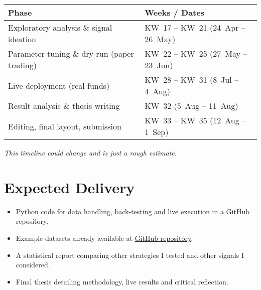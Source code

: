 \documentclass[12pt,a4paper]{article}
\begin{document}
\begin{tabular}{|>{\raggedright\arraybackslash}p{7cm}|>{\raggedright\arraybackslash}p{7cm}|}
\hline
\textbf{Phase} & \textbf{Weeks / Dates}\\ \hline
Exploratory analysis \& signal ideation & KW~17 -- KW~21 (24~Apr -- 26~May)\\ \hline
Parameter tuning \& dry-run (paper trading) & KW~22 -- KW~25 (27~May -- 23~Jun)\\ \hline
Live deployment (real funds) & KW~28 -- KW~31 (8~Jul -- 4~Aug)\\ \hline
Result analysis \& thesis writing & KW~32 (5~Aug -- 11~Aug)\\ \hline
Editing, final layout, submission & KW~33 -- KW~35 (12~Aug -- 1~Sep)\\ \hline
\end{tabular}

\vspace{0.5em}

\begin{tcolorbox}[colback=blue!10!white, colframe=blue!10!white, boxrule=0pt, arc=0pt, left=0pt, right=0pt, top=0pt, bottom=0pt]
\textit{This timeline could change and is just a rough estimate.}
\end{tcolorbox}

\section{Expected Delivery}
\begin{itemize}
  \item Python code for data handling, back-testing and live execution in a GitHub repository.
  \item Example datasets already available at
        \href{https://github.com/AJslashTracey/OBDeltaData}{GitHub repository}.
  \item A statistical report comparing other strategies I tested and other signals I considered.
  \item Final thesis detailing methodology, live results and critical reflection.
\end{itemize}
\end{document}
